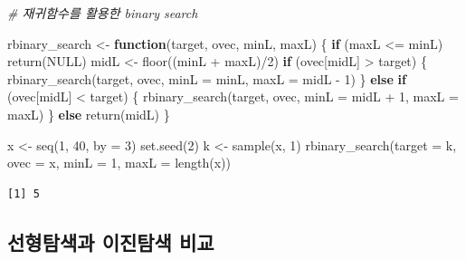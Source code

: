 \documentclass[
  11pt,
]{krantz}
\newenvironment{Shaded}{\begin{snugshade}}{\end{snugshade}}
\newcommand{\AttributeTok}[1]{\textcolor[rgb]{0.61,0.61,0.61}{#1}}
\newcommand{\CommentTok}[1]{\textcolor[rgb]{0.37,0.37,0.37}{\textit{#1}}}
\newcommand{\ConstantTok}[1]{\textcolor[rgb]{0,0,0}{#1}}
\newcommand{\ControlFlowTok}[1]{\textcolor[rgb]{0.27,0.27,0.27}{\textbf{#1}}}
\newcommand{\DecValTok}[1]{\textcolor[rgb]{0.06,0.06,0.06}{#1}}
\newcommand{\FunctionTok}[1]{\textcolor[rgb]{0,0,0}{#1}}
\newcommand{\NormalTok}[1]{#1}
\newcommand{\OtherTok}[1]{\textcolor[rgb]{0.37,0.37,0.37}{#1}}
\newcommand{\SpecialCharTok}[1]{\textcolor[rgb]{0,0,0}{#1}}
\begin{document}
\footnotesize

\begin{Shaded}
\begin{Highlighting}[]
\CommentTok{\# 재귀함수를 활용한 binary search }

\NormalTok{rbinary\_search }\OtherTok{\textless{}{-}} \ControlFlowTok{function}\NormalTok{(target, ovec, minL, maxL) \{}
  \ControlFlowTok{if}\NormalTok{ (maxL }\SpecialCharTok{\textless{}=}\NormalTok{ minL) }\FunctionTok{return}\NormalTok{(}\ConstantTok{NULL}\NormalTok{)}
\NormalTok{  midL }\OtherTok{\textless{}{-}} \FunctionTok{floor}\NormalTok{((minL }\SpecialCharTok{+}\NormalTok{ maxL)}\SpecialCharTok{/}\DecValTok{2}\NormalTok{)}
  \ControlFlowTok{if}\NormalTok{ (ovec[midL] }\SpecialCharTok{\textgreater{}}\NormalTok{ target) \{}
    \FunctionTok{rbinary\_search}\NormalTok{(target, ovec, }\AttributeTok{minL =}\NormalTok{ minL, }\AttributeTok{maxL =}\NormalTok{ midL }\SpecialCharTok{{-}} \DecValTok{1}\NormalTok{)}
\NormalTok{  \} }\ControlFlowTok{else} \ControlFlowTok{if}\NormalTok{ (ovec[midL] }\SpecialCharTok{\textless{}}\NormalTok{ target) \{}
    \FunctionTok{rbinary\_search}\NormalTok{(target, ovec, }\AttributeTok{minL =}\NormalTok{ midL }\SpecialCharTok{+} \DecValTok{1}\NormalTok{, }\AttributeTok{maxL =}\NormalTok{ maxL)}
\NormalTok{  \} }\ControlFlowTok{else} \FunctionTok{return}\NormalTok{(midL)}
\NormalTok{\}}

\NormalTok{x }\OtherTok{\textless{}{-}} \FunctionTok{seq}\NormalTok{(}\DecValTok{1}\NormalTok{, }\DecValTok{40}\NormalTok{, }\AttributeTok{by =} \DecValTok{3}\NormalTok{)}
\FunctionTok{set.seed}\NormalTok{(}\DecValTok{2}\NormalTok{)}
\NormalTok{k }\OtherTok{\textless{}{-}} \FunctionTok{sample}\NormalTok{(x, }\DecValTok{1}\NormalTok{)}
\FunctionTok{rbinary\_search}\NormalTok{(}\AttributeTok{target =}\NormalTok{ k, }\AttributeTok{ovec =}\NormalTok{ x, }\AttributeTok{minL =} \DecValTok{1}\NormalTok{, }\AttributeTok{maxL =} \FunctionTok{length}\NormalTok{(x))}
\end{Highlighting}
\end{Shaded}

\begin{verbatim}
[1] 5
\end{verbatim}

\normalsize

\hypertarget{uxc120uxd615uxd0d0uxc0c9uxacfc-uxc774uxc9c4uxd0d0uxc0c9-uxbe44uxad50}{%
\subsection{선형탐색과 이진탐색 비교}\label{uxc120uxd615uxd0d0uxc0c9uxacfc-uxc774uxc9c4uxd0d0uxc0c9-uxbe44uxad50}}
\end{document}
